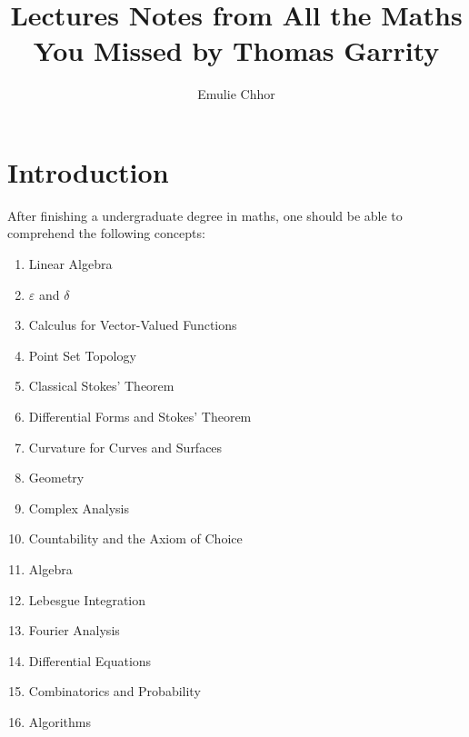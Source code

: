 \documentclass{article}
\begin{document}
\title{Lectures Notes from All the Maths You Missed by Thomas Garrity}
\author{Emulie Chhor}
\maketitle

\section{Introduction}

After finishing a undergraduate degree in maths, one should be able to comprehend
the following concepts:

    \begin{enumerate}
	\item Linear Algebra
	\item $\varepsilon$ and $\delta$
	\item Calculus for Vector-Valued Functions
	\item Point Set Topology
	\item Classical Stokes' Theorem
	\item Differential Forms and Stokes' Theorem
	\item Curvature for Curves and Surfaces
	\item Geometry
	\item Complex Analysis
	\item Countability and the Axiom of Choice
	\item Algebra
	\item Lebesgue Integration
	\item Fourier Analysis
	\item Differential Equations
	\item Combinatorics and Probability
	\item Algorithms
    \end{enumerate}

\subsection{}
\end{document}
